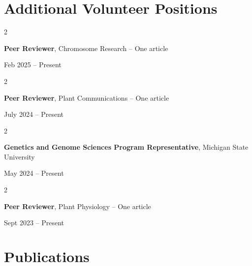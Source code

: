 \documentclass[10pt, letterpaper]{article}
\newenvironment{twocolentry}[2][]{
    \onecolentry
    \def\secondColumn{#2}
    \setcolumnwidth{\fill, 4.5 cm}
    \begin{paracol}{2}
}{
    \switchcolumn \raggedleft \secondColumn
    \end{paracol}
    \endonecolentry
} %
\begin{document}
    \section{Additional Volunteer Positions}




        \begin{samepage} 
            \begin{twocolentry}{
                Feb 2025 – Present
                }
                \textbf{Peer Reviewer}, Chromosome Research -- One article
            \end{twocolentry}
        \end{samepage} 


        \vspace{0.2 cm} 
        

        \begin{samepage} 
            \begin{twocolentry}{
                July 2024 – Present
                }
                \textbf{Peer Reviewer}, Plant Communications -- One article
            \end{twocolentry}
        \end{samepage} 


        \vspace{0.2 cm} 

        
        \begin{samepage} 
            \begin{twocolentry}{
                May 2024 – Present
                }
                \textbf{Genetics and Genome Sciences Program Representative}, Michigan State University
            \end{twocolentry}
        \end{samepage}  


        \vspace{0.2 cm}


        \begin{samepage} 
            \begin{twocolentry}{
                Sept 2023 – Present
                }
                \textbf{Peer Reviewer}, Plant Physiology -- One article
            \end{twocolentry}
        \end{samepage}
      
        

            
    \section{Publications}
\end{document}
